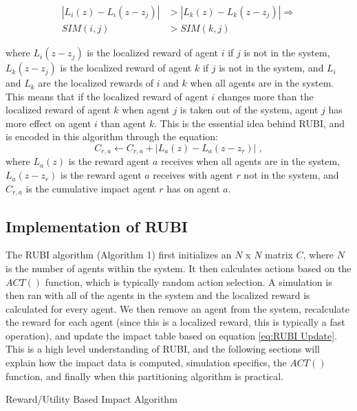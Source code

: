 \documentclass[letterpaper]{article}
\begin{document}
\begin{align}
|L_i(z) - L_i(z-z_j)| &> |L_k(z) - L_k(z-z_j)|   \Rightarrow \\
SIM(i,j) &> SIM(k,j) \nonumber
\end{align}

where $L_i(z-z_j)$ is the localized reward of agent $i$ if $j$ is not in the system, $L_k(z-z_j)$ is the localized reward of agent $k$ if $j$ is not in the system, and $L_i$ and $L_k$ are the localized rewards of $i$ and $k$ when all agents are in the system. This means that if the localized reward of agent $i$ changes more than the localized reward of agent $k$ when agent $j$ is taken out of the system, agent $j$ has more effect on agent $i$ than agent $k$. This is the essential idea behind RUBI, and is encoded in this algorithm through the equation:
%
\begin{equation} \label{eq:RUBI Update}
C_{r,a} \leftarrow C_{r,a} + |L_a(z) - L_a(z-z_r) | \;,
\end{equation}
%
where $L_a(z)$ is the reward agent $a$ receives when all agents are in the system, $L_a(z-z_r)$ is the reward agent $a$ receives with agent $r$ not in the system, and $C_{r,a}$ is the cumulative impact agent $r$ has on agent $a$.

\subsection{Implementation of RUBI}
The RUBI algorithm (Algorithm 1) first initializes an $N$ x $N$ matrix $C$, where $N$ is the number of agents within the system. It then calculates actions based on the $ACT()$ function, which is typically random action selection. A simulation is then ran with all of the agents in the system and the localized reward is calculated for every agent. We then remove an agent from the system, recalculate the reward for each agent (since this is a localized reward, this is typically a fast operation), and update the impact table based on equation \ref{eq:RUBI Update}. This is a high level understanding of RUBI, and the following sections will explain how the impact data is computed, simulation specifics, the $ACT()$ function, and finally when this partitioning algorithm is practical.

\begin{algorithm} \label{alg:RUBI}
  \caption{Reward/Utility Based Impact Algorithm}
  \begin{algorithmic}[1]
    \Statex
				\EndFor
		\EndFor
	\EndFor        
    \EndFunction
  \end{algorithmic}
\end{algorithm}
\end{document}
